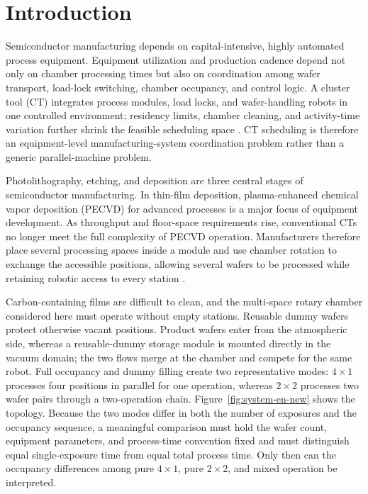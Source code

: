 \documentclass[final,5p,times,twocolumn]{elsarticle}
\begin{document}
\section{Introduction}
\label{sec:intro-new}

Semiconductor manufacturing depends on capital-intensive, highly automated process equipment. Equipment utilization and production cadence depend not only on chamber processing times but also on coordination among wafer transport, load-lock switching, chamber occupancy, and control logic. A cluster tool (CT) integrates process modules, load locks, and wafer-handling robots in one controlled environment; residency limits, chamber cleaning, and activity-time variation further shrink the feasible scheduling space \citep{pan2018survey}. CT scheduling is therefore an equipment-level manufacturing-system coordination problem rather than a generic parallel-machine problem.

Photolithography, etching, and deposition are three central stages of semiconductor manufacturing. In thin-film deposition, plasma-enhanced chemical vapor deposition (PECVD) for advanced processes is a major focus of equipment development. As throughput and floor-space requirements rise, conventional CTs no longer meet the full complexity of PECVD operation. Manufacturers therefore place several processing spaces inside a module and use chamber rotation to exchange the accessible positions, allowing several wafers to be processed while retaining robotic access to every station \citep{gu2024applied}.

Carbon-containing films are difficult to clean, and the multi-space rotary chamber considered here must operate without empty stations. Reusable dummy wafers protect otherwise vacant positions. Product wafers enter from the atmospheric side, whereas a reusable-dummy storage module is mounted directly in the vacuum domain; the two flows merge at the chamber and compete for the same robot. Full occupancy and dummy filling create two representative modes: $4\times1$ processes four positions in parallel for one operation, whereas $2\times2$ processes two wafer pairs through a two-operation chain. Figure~\ref{fig:system-en-new} shows the topology. Because the two modes differ in both the number of exposures and the occupancy sequence, a meaningful comparison must hold the wafer count, equipment parameters, and process-time convention fixed and must distinguish equal single-exposure time from equal total process time. Only then can the occupancy differences among pure $4\times1$, pure $2\times2$, and mixed operation be interpreted.
\end{document}
